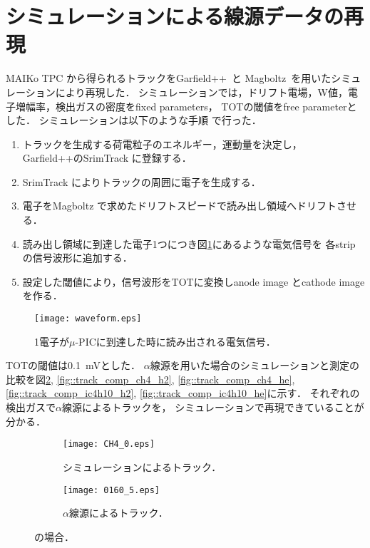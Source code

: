 \documentclass[../master]{subfiles}
\begin{document}
\section{シミュレーションによる線源データの再現}
MAIKo TPC から得られるトラックをGarfield++~\cite{garfield++}と
Magboltz~\cite{magboltz}を用いたシミュレーションにより再現した．
シミュレーションでは，ドリフト電場，W値，電子増幅率，検出ガスの密度をfixed parameters，
TOTの閾値をfree parameterとした．
シミュレーションは以下のような手順%
で行った．
\begin{enumerate}
\item\label{sim::particle_generate}
  トラックを生成する荷電粒子のエネルギー，運動量を決定し，
  Garfield++のSrimTrack に登録する．
\item
  SrimTrack によりトラックの周囲に電子を生成する．
\item
  電子をMagboltz で求めたドリフトスピードで読み出し領域へドリフトさせる．
\item
  読み出し領域に到達した電子1つにつき図\ref{fig::mu-pic_readout}にあるような電気信号を
  各strip の信号波形に追加する．
\item
  設定した閾値により，信号波形をTOTに変換しanode image とcathode image を作る．
\end{enumerate}
\begin{figure}
  \centering
  \texttt{[image: waveform.eps]}
  \caption{1電子が$\mu$-PICに到達した時に読み出される電気信号．}
  \label{fig::mu-pic_readout}
\end{figure}
TOTの閾値は\SI{0.1}{\milli\volt}とした．
$\alpha$線源を用いた場合のシミュレーションと測定の比較を図\ref{fig::track_comp_ch4},
\ref{fig::track_comp_ch4_h2}, \ref{fig::track_comp_ch4_he}, 
\ref{fig::track_comp_ic4h10_h2}, \ref{fig::track_comp_ic4h10_he}に示す．
それぞれの検出ガスで$\alpha$線源によるトラックを，
シミュレーションで再現できていることが分かる．
\begin{figure}[h]
  \centering
  \begin{subfigure}{0.48\columnwidth}
    \centering
    \texttt{[image: CH4\_0.eps]}
    \caption{シミュレーションによるトラック．}
  \end{subfigure}
  \begin{subfigure}{0.48\columnwidth}
    \centering
    \texttt{[image: 0160\_5.eps]}
    \caption{$\alpha$線源によるトラック．}
  \end{subfigure}
  \caption{\Methane の場合．}
  \label{fig::track_comp_ch4}
\end{figure}
\end{document}
